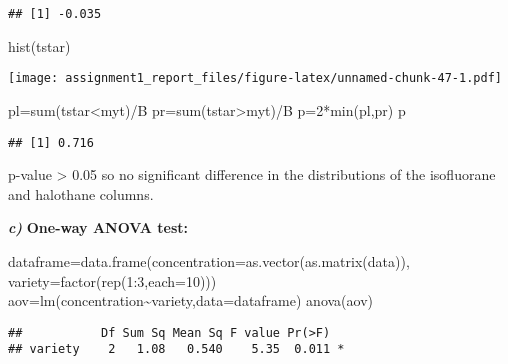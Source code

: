 \documentclass[
]{article}
\newenvironment{Shaded}{\begin{snugshade}}{\end{snugshade}}
\newcommand{\AttributeTok}[1]{\textcolor[rgb]{0.77,0.63,0.00}{#1}}
\newcommand{\DecValTok}[1]{\textcolor[rgb]{0.00,0.00,0.81}{#1}}
\newcommand{\FunctionTok}[1]{\textcolor[rgb]{0.00,0.00,0.00}{#1}}
\newcommand{\NormalTok}[1]{#1}
\newcommand{\OtherTok}[1]{\textcolor[rgb]{0.56,0.35,0.01}{#1}}
\newcommand{\SpecialCharTok}[1]{\textcolor[rgb]{0.00,0.00,0.00}{#1}}
\begin{document}
\begin{verbatim}
## [1] -0.035
\end{verbatim}

\begin{Shaded}
\begin{Highlighting}[]
\FunctionTok{hist}\NormalTok{(tstar)}
\end{Highlighting}
\end{Shaded}

\texttt{[image: assignment1\_report\_files/figure-latex/unnamed-chunk-47-1.pdf]}

\begin{Shaded}
\begin{Highlighting}[]
\NormalTok{pl}\OtherTok{=}\FunctionTok{sum}\NormalTok{(tstar}\SpecialCharTok{\textless{}}\NormalTok{myt)}\SpecialCharTok{/}\NormalTok{B}
\NormalTok{pr}\OtherTok{=}\FunctionTok{sum}\NormalTok{(tstar}\SpecialCharTok{\textgreater{}}\NormalTok{myt)}\SpecialCharTok{/}\NormalTok{B}
\NormalTok{p}\OtherTok{=}\DecValTok{2}\SpecialCharTok{*}\FunctionTok{min}\NormalTok{(pl,pr)}
\NormalTok{p}
\end{Highlighting}
\end{Shaded}

\begin{verbatim}
## [1] 0.716
\end{verbatim}

p-value \textgreater{} 0.05 so no significant difference in the
distributions of the isofluorane and halothane columns.

\textbf{\emph{c)}} \textbf{One-way ANOVA test:}

\begin{Shaded}
\begin{Highlighting}[]
\NormalTok{dataframe}\OtherTok{=}\FunctionTok{data.frame}\NormalTok{(}\AttributeTok{concentration=}\FunctionTok{as.vector}\NormalTok{(}\FunctionTok{as.matrix}\NormalTok{(data)),}
                     \AttributeTok{variety=}\FunctionTok{factor}\NormalTok{(}\FunctionTok{rep}\NormalTok{(}\DecValTok{1}\SpecialCharTok{:}\DecValTok{3}\NormalTok{,}\AttributeTok{each=}\DecValTok{10}\NormalTok{)))}
\NormalTok{aov}\OtherTok{=}\FunctionTok{lm}\NormalTok{(concentration}\SpecialCharTok{\textasciitilde{}}\NormalTok{variety,}\AttributeTok{data=}\NormalTok{dataframe)}
\FunctionTok{anova}\NormalTok{(aov)}
\end{Highlighting}
\end{Shaded}

\begin{verbatim}
##           Df Sum Sq Mean Sq F value Pr(>F)  
## variety    2   1.08   0.540    5.35  0.011 *
\end{verbatim}
\end{document}
